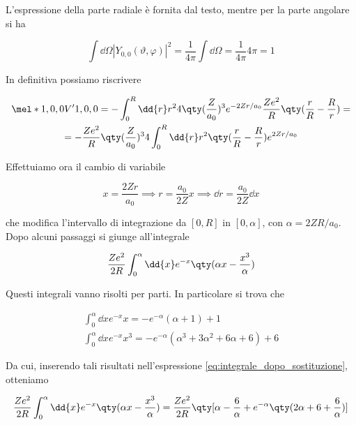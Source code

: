 \begin{soluzione}
   L'espressione della parte radiale è fornita dal testo, mentre per la parte angolare si ha

   \begin{equation*}
      \int \dd{\Omega} |Y_{0,0}(\vartheta,\varphi)|^2
      =\frac{1}{4\pi} \int \dd{\Omega}
      =\frac{1}{4\pi} 4\pi
      =1
   \end{equation*}

   In definitiva possiamo riscrivere

   \begin{gather*}
      \mel*{1,0,0}{V'}{1,0,0}
      =-\int_{0}^{R} \dd{r} r^2 4 \qty( \frac{Z}{a_0} )^3 e^{-2Zr/a_0} \frac{Ze^2}{R} \qty( \frac{r}{R} - \frac{R}{r} )
      =\\
      =-\frac{Z e^2}{R} \qty( \frac{Z}{a_0} )^3 4 \int_{0}^{R} \dd{r} r^2 \qty( \frac{r}{R} - \frac{R}{r} ) e^{2Zr/a_0}
   \end{gather*}

   Effettuiamo ora il cambio di variabile

   \begin{equation*}
      x=\frac{2Zr}{a_0}
      \implies
      r=\frac{a_0}{2Z}x
      \implies
      \dd{r}=\frac{a_0}{2Z} \dd{x}
   \end{equation*}

   che modifica l'intervallo di integrazione da $[0,R]$ in $[0,\alpha]$, con $\alpha=2ZR/a_0$. Dopo alcuni passaggi si giunge all'integrale

   \begin{equation}
      \frac{Ze^2}{2R} \int_{0}^{\alpha} \dd{x} e^{-x} \qty( \alpha x - \frac{x^3}{\alpha} )
      \label{eq:integrale_dopo_sostituzione}
   \end{equation}

   Questi integrali vanno risolti per parti. In particolare si trova che

   \begin{gather*}
      \int_{0}^{\alpha} \dd{x} e^{-x} x
      =-e^{-\alpha} (\alpha + 1) + 1
      \\[0.1cm]
      \int_{0}^{\alpha} \dd{x} e^{-x} x^3
      =-e^{-\alpha} (\alpha^3 + 3\alpha^2 + 6\alpha + 6) + 6
   \end{gather*}

   Da cui, inserendo tali risultati nell'espressione \eqref{eq:integrale_dopo_sostituzione}, otteniamo

   \begin{equation*}
      \frac{Ze^2}{2R} \int_{0}^{\alpha} \dd{x} e^{-x} \qty( \alpha x - \frac{x^3}{\alpha} )
      =\frac{Z e^2}{2R} \qty[ \alpha - \frac{6}{\alpha} + e^{-\alpha}\qty( 2\alpha + 6 + \frac{6}{\alpha} ) ]
   \end{equation*}


\end{soluzione}
